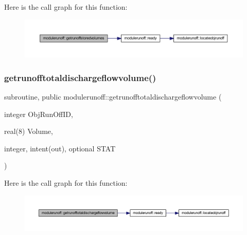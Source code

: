 Here is the call graph for this function\+:
\nopagebreak
\begin{figure}[H]
\begin{center}
\leavevmode
\includegraphics[width=350pt]{namespacemodulerunoff_a9d8c0b3cb553adb36c76cde2d6bcaef7_cgraph}
\end{center}
\end{figure}
\mbox{\label{namespacemodulerunoff_aa4377dd8080b614590e0609f019f9764}} 
\subsubsection{\texorpdfstring{getrunofftotaldischargeflowvolume()}{getrunofftotaldischargeflowvolume()}}
{\footnotesize\ttfamily subroutine, public modulerunoff\+::getrunofftotaldischargeflowvolume (\begin{DoxyParamCaption}\item[{integer}]{Obj\+Run\+Off\+ID,  }\item[{real(8)}]{Volume,  }\item[{integer, intent(out), optional}]{S\+T\+AT }\end{DoxyParamCaption})}

Here is the call graph for this function\+:
\nopagebreak
\begin{figure}[H]
\begin{center}
\leavevmode
\includegraphics[width=350pt]{namespacemodulerunoff_aa4377dd8080b614590e0609f019f9764_cgraph}
\end{center}
\end{figure}
\mbox{\label{namespacemodulerunoff_aa890e5ad105516c116e7c4f53b656bfb}} 
